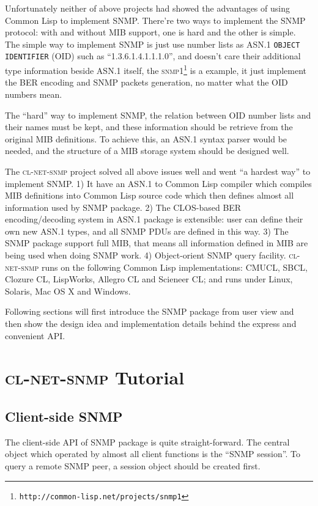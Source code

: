 \documentclass[reprint,natbib,9pt]{sigplanconf}
\begin{document}
Unfortunately neither of above projects had showed the advantages of using
Common Lisp to implement SNMP. There're two ways to implement the SNMP protocol:
with and without MIB support, one is hard and the other is simple. The simple
way to implement SNMP is just use number lists as ASN.1 \texttt{OBJECT IDENTIFIER} (OID)
such as ``1.3.6.1.4.1.1.1.0'', and doesn't care their additional type information
beside ASN.1 itself, the
\textsc{snmp1}\footnote{\texttt{http://common-lisp.net/projects/snmp1}} is
a example, it just implement the BER encoding and SNMP packets
generation, no matter what the OID numbers mean.

The ``hard'' way to implement SNMP, the relation between OID number lists
and their names must be kept, and these information should be retrieve from the
original MIB definitions. To achieve this, an ASN.1 syntax parser would be needed,
and the structure of a MIB storage system should be designed well.

The \textsc{cl-net-snmp} project solved all above issues well and went
``a hardest way'' to implement SNMP. 1) It have an ASN.1 to Common Lisp
compiler which compiles MIB definitions into Common Lisp source code which
then defines almost all information used by SNMP package. 2) The CLOS-based BER
encoding/decoding system in ASN.1 package is extensible: user can define their
own new ASN.1 types, and all SNMP PDUs are defined in this way. 3) The SNMP
package support full MIB, that means all information defined in
MIB are being used when doing SNMP work. 4) Object-orient SNMP query facility.
\textsc{cl-net-snmp} runs on the following Common Lisp
implementations: CMUCL, SBCL, Clozure CL, LispWorks, Allegro CL and
Scieneer CL; and runs under Linux, Solaris, Mac OS X and Windows.

Following sections will first introduce the SNMP package from user view
and then show the design idea and implementation details behind
the express and convenient API.

\section{\textsc{cl-net-snmp} Tutorial}

\subsection{Client-side SNMP}

The client-side API of SNMP package is quite straight-forward. The
central object which operated by almost all client functions is the
``SNMP session''. To query a remote SNMP peer, a session object should
be created first.
\end{document}
